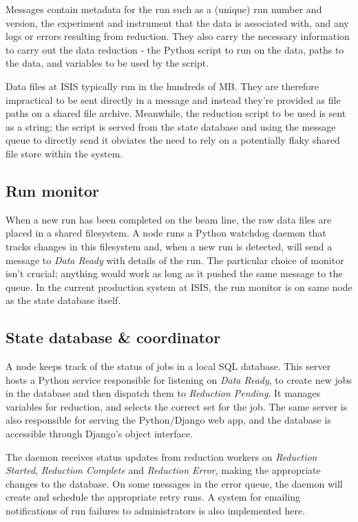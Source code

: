 \documentclass[twocolumn]{article}
\begin{document}
Messages contain metadata for the run such as a (unique) run number and
version, the experiment and instrument that the data is associated with,
and any logs or errors resulting from reduction. They also carry the
necessary information to carry out the data reduction - the Python
script to run on the data, paths to the data, and variables to be used
by the script.

Data files at ISIS typically run in the hundreds of MB. They are therefore 
impractical to be sent directly in a message and instead they're provided as file
paths on a shared file archive. Meanwhile, the reduction script to be
used is sent as a string; the script is served from the state database
and using the message queue to directly send it obviates the need to
rely on a potentially flaky shared file store within the system.

\subsection{Run monitor}\label{run-monitor}

When a new run has been completed on the beam line, the raw data files are
placed in a shared filesystem. A node runs a Python watchdog daemon that
tracks changes in this filesystem and, when a new run is detected, will send a
message to \emph{Data Ready} with details of the run. The particular
choice of monitor isn't crucial; anything would work as long as it
pushed the same message to the queue. In the current production system
at ISIS, the run monitor is on same node as the state database itself.

\subsection{State database \& coordinator}\label{state-database}

A node keeps track of the status of jobs in a local SQL database. This
server hosts a Python service responsible for listening on \emph{Data
Ready}, to create new jobs in the database and then dispatch them to \emph{Reduction
Pending}. It manages variables for reduction, and selects the correct
set for the job. The same server is also responsible for serving the
Python/Django\cite{django} web app, and the database is accessible through
Django's object interface.

The daemon receives status updates from reduction workers on
\emph{Reduction Started}, \emph{Reduction Complete} and \emph{Reduction
Error}, making the appropriate changes to the database. On some messages
in the error queue, the daemon will create and schedule the appropriate
retry runs. A system for emailing notifications of run failures to
administrators is also implemented here.
\end{document}
